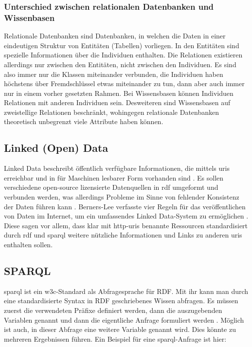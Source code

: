 \subsubsection{Unterschied zwischen relationalen Datenbanken und Wissenbasen}
Relationale Datenbanken sind Datenbanken, in welchen die Daten in einer eindeutigen Struktur von Entitäten (Tabellen) vorliegen.
In den Entitäten sind spezielle Informationen über die Individuen enthalten.
Die Relationen existieren allerdings nur zwischen den Entitäten, nicht zwischen den Individuen.
Es sind also immer nur die Klassen miteinander verbunden, die Individuen haben höchstens über Fremdschlüssel etwas miteinander zu tun, dann aber auch immer nur in einem vorher gesetzten Rahmen.
Bei Wissensbasen können Individuen Relationen mit anderen Individuen sein.
Desweiteren sind Wissensbasen auf zweistellige Relationen beschränkt, wohingegen relationale Datenbanken theoretisch unbegrenzt viele Attribute haben können.

\subsection{Linked (Open) Data}

Linked Data beschreibt öffentlich verfügbare Informationen, die mittels \acp{uri} erreichbar und in für Maschinen lesbarer Form vorhanden sind \citep{linkeddata}.
Es sollen verschiedene open-source lizensierte Datenquellen in \ac{rdf} umgeformt und verbunden werden, was allerdings Probleme im Sinne von fehlender Konsistenz der Daten führen kann \citep{semanticwebreview}.
Berners-Lee verfasste vier Regeln für das veröffentlichen von Daten im Internet, um ein umfassendes Linked Data-System zu ermöglichen \citep{linkeddatadesignissues}.
Diese sagen vor allem, dass klar mit \ac{http}-\acp{uri} benannte Ressourcen standardisiert durch \ac{rdf} und \ac{sparql} weitere nützliche Informationen und Links zu anderen \acp{uri} enthalten sollen.

\subsection{SPARQL}\label{sub:sparql}

\ac{sparql} ist ein \ac{w3c}-Standard als Abfragesprache für RDF.
Mit ihr kann man durch eine standardisierte Syntax in RDF geschriebenes Wissen abfragen.
Es müssen zuerst die verwendeten Präfixe definiert werden, dann die auszugebenden Variablen genannt und dann die eigentliche Anfrage formuliert werden \citep[S.~203]{semanticwebgrundlagen}.
Möglich ist auch, in dieser Abfrage eine weitere Variable genannt wird.
Dies könnte zu mehreren Ergebnissen führen.
Ein Beispiel für eine \ac{sparql}-Anfrage ist hier:

